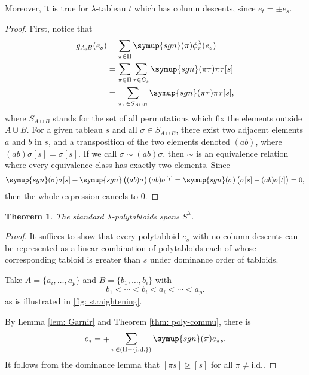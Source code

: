 \documentclass{assignment}[2019/10/15]
\theoremstyle{plain}
\newtheorem{theorem}{Theorem}[section]
\newcommand{\sgn}{\mathop{}\!\symup{sgn}}
\newcommand{\id}{\text{i.d.}}
\begin{document}
    Moreover, it is true for $\lambda$-tableau $t$ which has column descents, since $e_t=\pm e_s$.

    \begin{proof}
        First, notice that
        \begin{equation}
            \begin{aligned}
                g_{A, B}(e_s)
                &= \sum_{\pi\in\Pi}\sgn(\pi)\phi_\pi^\lambda(e_s)\\
                &= \sum_{\pi\in\Pi}\sum_{\tau\in C_s}\sgn(\pi\tau)\pi\tau[s]\\
                &= \sum_{\pi\tau\in S_{A\cup B}}\sgn(\pi\tau)\pi\tau[s],
            \end{aligned}
        \end{equation}
        where $S_{A\cup B}$ stands for the set of all permutations which fix the elements outside $A\cup B$. For a given tableau $s$ and all $\sigma\in S_{A\cup B}$, there exist two adjacent elements $a$ and $b$ in $s$, and a transposition of the two elements denoted $(a b)$, where $(a b)\sigma[s] = \sigma[s]$. If we call $\sigma\sim (a b)\sigma$, then $\sim$ is an equivalence relation where every equivalence class has exactly two elements. Since
        \begin{equation}
            \sgn(\sigma)\sigma[s] + \sgn\left((a b)\sigma\right)(a b)\sigma[t] = \sgn(\sigma)\left(\sigma[s]-(a b)\sigma[t]\right) = 0,
        \end{equation}
        then the whole expression cancels to 0.
    \end{proof}

    \begin{theorem}
        The standard $\lambda$-polytabloids spans $S^\lambda$.
    \end{theorem}

    \begin{proof}
        It suffices to show that every polytabloid $e_s$ with no column descents can be represented as a linear combination of polytabloids each of whose corresponding tabloid is greater than $s$ under dominance order of tabloids.

        Take $A=\{a_i, \dotsc, a_p\}$ and $B = \{b_1, \dotsc, b_i\}$ with
        \begin{equation}
            b_1<\dotsb <b_i<a_i<\dotsb <a_p.
        \end{equation}
        as is illustrated in \ref{fig: straightening}.

        By Lemma \ref{lem: Garnir} and Theorem \ref{thm: poly-commu}, there is
        \begin{equation}
            e_s = \mp\sum_{\pi\in(\Pi-\{\id\})}\sgn(\pi)e_{\pi s}.
        \end{equation}
        It follows from the dominance lemma that $[\pi s]\unrhd[s]$ for all $\pi\neq \id$.
    \end{proof}
\end{document}
